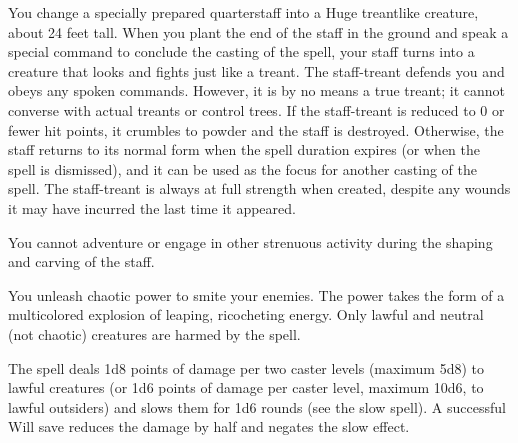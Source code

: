 \begin{multicols}{2}
\begin{small}
\noindent You change a specially prepared quarterstaff into a Huge treantlike creature, about 24 feet tall. When you plant the end of the staff in the ground and speak a special command to conclude the casting of the spell, your staff turns into a creature that looks and fights just like a treant. The staff-treant defends you and obeys any spoken commands. However, it is by no means a true treant; it cannot converse with actual treants or control trees. If the staff-treant is reduced to 0 or fewer hit points, it crumbles to powder and the staff is destroyed. Otherwise, the staff returns to its normal form when the spell duration expires (or when the spell is dismissed), and it can be used as the focus for another casting of the spell. The staff-treant is always at full strength when created, despite any wounds it may have incurred the last time it appeared.


\smallskip\noindent You cannot adventure or engage in other strenuous activity during the shaping and carving of the staff.

\noindent You unleash chaotic power to smite your enemies. The power takes the form of a multicolored explosion of leaping, ricocheting energy. Only lawful and neutral (not chaotic) creatures are harmed by the spell.

\smallskip\noindent The spell deals 1d8 points of damage per two caster levels (maximum 5d8) to lawful creatures (or 1d6 points of damage per caster level, maximum 10d6, to lawful outsiders) and slows them for 1d6 rounds (see the slow spell). A successful Will save reduces the damage by half and negates the slow effect.


\end{small}
\end{multicols}
